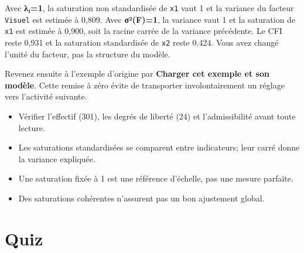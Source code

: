 \documentclass[
  french,
  11pt,
  a4paper,
  DIV=11,
  numbers=noendperiod]{scrreprt}
\providecommand{\tightlist}{%
  \setlength{\itemsep}{0pt}\setlength{\parskip}{0pt}}
\begin{document}
\begin{tcolorbox}[enhanced jigsaw, arc=.35mm, bottomrule=.15mm, bottomtitle=1mm, breakable, colback=white, colbacktitle=quarto-callout-tip-color!10!white, colframe=quarto-callout-tip-color-frame, coltitle=black, left=2mm, leftrule=.75mm, opacityback=0, opacitybacktitle=0.6, rightrule=.15mm, title={Réponse}, titlerule=0mm, toprule=.15mm, toptitle=1mm]

Avec \textbf{λ₁=1}, la saturation non standardisée de \texttt{x1} vaut 1
et la variance du facteur \texttt{Visuel} est estimée à 0,809. Avec
\textbf{σ²(F)=1}, la variance vaut 1 et la saturation de \texttt{x1} est
estimée à 0,900, soit la racine carrée de la variance précédente. Le CFI
reste 0,931 et la saturation standardisée de \texttt{x2} reste 0,424.
Vous avez changé l'unité du facteur, pas la structure du modèle.

Revenez ensuite à l'exemple d'origine par \textbf{Charger cet exemple et
son modèle}. Cette remise à zéro évite de transporter involontairement
un réglage vers l'activité suivante.

\end{tcolorbox}

\begin{tcolorbox}[enhanced jigsaw, arc=.35mm, bottomrule=.15mm, bottomtitle=1mm, breakable, colback=white, colbacktitle=quarto-callout-important-color!10!white, colframe=quarto-callout-important-color-frame, coltitle=black, left=2mm, leftrule=.75mm, opacityback=0, opacitybacktitle=0.6, rightrule=.15mm, title={À retenir}, titlerule=0mm, toprule=.15mm, toptitle=1mm]

\begin{itemize}
\tightlist
\item
  Vérifier l'effectif (301), les degrés de liberté (24) et
  l'admissibilité avant toute lecture.
\item
  Les saturations standardisées se comparent entre indicateurs; leur
  carré donne la variance expliquée.
\item
  Une saturation fixée à 1 est une référence d'échelle, pas une mesure
  parfaite.
\item
  Des saturations cohérentes n'assurent pas un bon ajustement global.
\end{itemize}

\end{tcolorbox}

\section{Quiz}\label{quiz-2}
\end{document}
